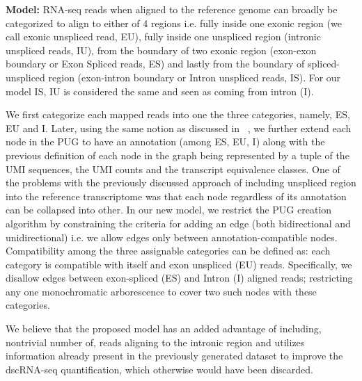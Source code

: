 \textbf{Model:} RNA-seq reads when aligned to the reference genome can broadly be categorized to 
align to either of 4 regions i.e. fully inside one exonic region (we call exonic unspliced read, EU), 
fully inside one unspliced region (intronic unspliced reads, IU),  from the boundary of two
exonic region (exon-exon boundary or Exon Spliced reads, ES) and lastly from the boundary of 
spliced-unspliced region (exon-intron boundary or Intron unspliced reads, IS). For our
model IS, IU is considered the same and seen as coming from intron (I).

We first categorize each mapped reads into one the three categories, namely, ES, EU and I.
Later, using the same notion as discussed in ~, we further extend each node in the PUG 
to have an annotation (among ES, EU, I) along with the previous definition of each node in the graph
being represented by a tuple of the UMI sequences, the UMI counts and the transcript 
equivalence classes. One of the problems with the previously discussed \naive approach of including 
unspliced region into the reference transcriptome was that each node regardless of its annotation 
can be collapsed into other. In our new model, we restrict the PUG creation algorithm by constraining 
the criteria for adding an edge (both bidirectional and unidirectional) i.e. we allow edges only between
annotation-compatible nodes. Compatibility among the three assignable categories can be defined as:
each category is compatible with itself and exon unspliced (EU) reads. Specifically, we disallow
edges between exon-spliced (ES) and Intron (I) aligned reads; restricting any one monochromatic
arborescence to cover two such nodes with these categories.

We believe that the proposed model has an added advantage of including, nontrivial number of, reads
aligning to the intronic region and utilizes information already present in the previously generated
dataset to improve the dscRNA-seq quantification, which otherwise would have been discarded.


























